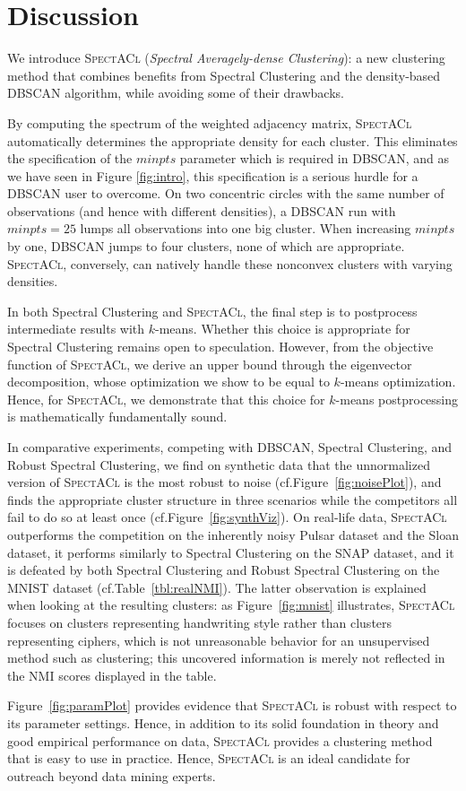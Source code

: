 \section{Discussion}
We introduce \textsc{SpectACl} (\emph{Spectral Averagely-dense Clustering}): a new clustering method that combines benefits from Spectral Clustering and the density-based DBSCAN algorithm, while avoiding some of their drawbacks. 

By computing the spectrum of the weighted adjacency matrix, \textsc{SpectACl} automatically determines the appropriate density for each cluster.  This eliminates the specification of the $minpts$ parameter which is required in DBSCAN, and as we have seen in Figure \ref{fig:intro}, this specification is a serious hurdle for a DBSCAN user to overcome. On two concentric circles with the same number of observations (and hence with different densities), a DBSCAN run with $minpts=25$ lumps all observations into one big cluster.  When increasing $minpts$ by one, DBSCAN jumps to four clusters, none of which are appropriate. \textsc{SpectACl}, conversely, can natively handle these nonconvex clusters with varying densities.

In both Spectral Clustering and \textsc{SpectACl}, the final step is to postprocess intermediate results with $k$-means. Whether this choice is appropriate for Spectral Clustering remains open to speculation.  However, from the objective function of \textsc{SpectACl}, we derive an upper bound through the eigenvector decomposition, whose optimization we show to be equal to $k$-means optimization.  Hence, for \textsc{SpectACl}, we demonstrate that this choice for $k$-means postprocessing is mathematically fundamentally sound.

In comparative experiments, competing with DBSCAN, Spectral Clustering, and Robust Spectral Clustering, we find on synthetic data that the unnormalized version of \textsc{SpectACl} is the most robust to noise (cf.\@ Figure~\ref{fig:noisePlot}), and finds the appropriate cluster structure in three scenarios while the competitors all fail to do so at least once (cf.\@ Figure~\ref{fig:synthViz}).  On real-life data, \textsc{SpectACl} outperforms the competition on the inherently noisy Pulsar dataset and the Sloan dataset, it performs similarly to Spectral Clustering on the SNAP dataset, and it is defeated by both Spectral Clustering and Robust Spectral Clustering on the MNIST dataset (cf.\@ Table~\ref{tbl:realNMI}). The latter observation is explained when looking at the resulting clusters: as Figure~\ref{fig:mnist} illustrates, \textsc{SpectACl} focuses on clusters representing handwriting style rather than clusters representing ciphers, which is not unreasonable behavior for an unsupervised method such as clustering; this uncovered information is merely not reflected in the NMI scores displayed in the table.

Figure~\ref{fig:paramPlot} provides evidence that \textsc{SpectACl} is robust with respect to its parameter settings.  Hence, in addition to its solid foundation in theory and good empirical performance on data, \textsc{SpectACl} provides a clustering method that is easy to use in practice.  Hence, \textsc{SpectACl} is an ideal candidate for outreach beyond data mining experts.
